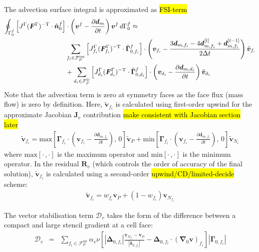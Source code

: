 \documentclass[sn-mathphys,Numbered]{sn-jnl}%
\newcommand{\bb}{\boldsymbol}
\begin{document}
The advection surface integral is approximated as \hl{FSI-term}
\begin{align}
	\oint_{\Gamma^f_0}  \left[ J^\Gamma (\bb{F}^\Gamma)^{-\text{T}} \cdot \hat{\bb{n}}_0^f \right]
		& \cdot \left(\bb{v}^f - \frac{\partial \bb{d}_m}{\partial t}\right) \bb{v}^f \, d\Gamma^f_0
		\approx \notag \\
		& \sum_{f_i \in \mathcal{F}_P^{\text{int}}}
	\left[ J^\Gamma_{f_i} (\bb{F}^\Gamma_{f_i})^{-\text{T}} \cdot \hat{\bb{\Gamma}}_{0, f_i}^f \right]
		\cdot \left( \bb{v}_{f_i} - \frac{3 \bb{d}_{m,f_i} - 4 \bb{d}_{m,f_i}^{[t]} + \bb{d}_{m,f_i}^{[t-1]}}{2\Delta t}  \right) \tilde{\bb{v}}_{f_i} \notag \\
	&+ \sum_{d_i \in \mathcal{F}_P^{\text{D}}} \left[ J^\Gamma_{d_i} (\bb{F}^\Gamma_{d_i})^{-\text{T}} \cdot \hat{\bb{\Gamma}}_{0, d_i}^f \right]
		 \cdot \left( \bb{v}_{d_i} - \frac{\partial \bb{d}_{m,d_i}}{\partial t} \right) \tilde{\bb{v}}_{d_i}
\end{align}
Note that the advection term is zero at symmetry faces as the face flux (mass flow) is zero by definition.
Here, $\tilde{\bb{v}}_{f_i}$ is calculated using first-order upwind for the approximate Jacobian $\bb{J}_v$ contribution \hl{make consistent with Jacobian section later}
\begin{eqnarray}
	\tilde{\bb{v}}_{f_i} =
		\text{max}\left[ \bb{\Gamma}_{f_i} \cdot \left( \bb{v}_{f_i} - \frac{\partial \bb{d}_{m,f_i}}{\partial t} \right), \, 0\right] \tilde{\bb{v}}_P
		+ \text{min}\left[ \bb{\Gamma}_{f_i} \cdot \left( \bb{v}_{f_i} - \frac{\partial \bb{d}_{m,f_i}}{\partial t} \right), \, 0\right] \tilde{\bb{v}}_{N_i}
\end{eqnarray}
where $\text{max}\left[\cdot \,, \cdot \right]$ is the maximum operator and $\text{min}\left[\cdot \,, \cdot \right]$ is the minimum operator.
In the residual $\bb{R}_v$ (which controls the order of accuracy of the final solution), $\tilde{\bb{v}}_{f_i}$ is calculated using a second-order \hl{upwind/CD/limited-decide} scheme:
\begin{eqnarray}
	\tilde{\bb{v}}_{f_i} =  w_{f_i} \bb{v}_P + (1 - w_{f_i}) \bb{v}_{N_{f_i}}
\end{eqnarray}

The vector stabilisation term $\bb{\mathcal{D}}_v$ takes the form of the difference between a compact and large stencil gradient at a cell face:
\begin{eqnarray}
	\bb{\mathcal{D}}_v
	&=& \sum_{f_i \in \mathcal{F}^{\text{int}}_P} \alpha_v \nu \left[
		\left|\bb{\Delta}_{0,f_i} \right| \frac{ \bb{v}_{N_{f_i}} - \bb{v}_P}{\left|\bb{\delta}_{0,f_i}\right|}	- \bb{\Delta}_{0,f_i} \cdot \left(\bb{\nabla}_0 \bb{v} \right)_{f_i}
		\right]    \left|\bb{\Gamma}_{0,f_i}\right|
\end{eqnarray}
\end{document}
